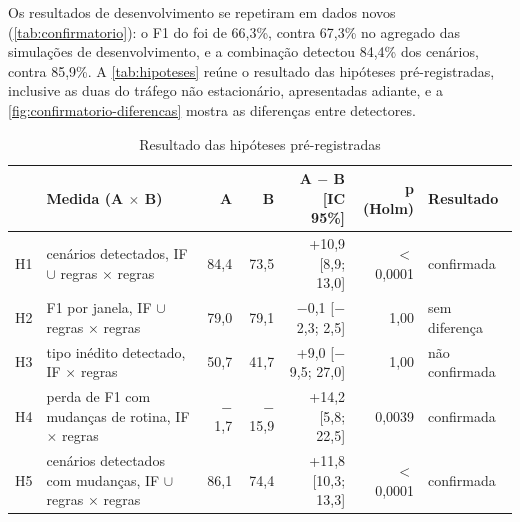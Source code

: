Os resultados de desenvolvimento se repetiram em dados novos (\autoref{tab:confirmatorio}): o F1
do \iforest{} foi de 66,3\%, contra 67,3\% no agregado das simulações de desenvolvimento, e a
combinação detectou 84,4\% dos cenários, contra 85,9\%. A \autoref{tab:hipoteses} reúne o
resultado das hipóteses pré-registradas, inclusive as duas do tráfego não estacionário,
apresentadas adiante, e a \autoref{fig:confirmatorio-diferencas} mostra as diferenças entre
detectores.

\begin{table}[htb]
    \centering
    \ABNTEXfontereduzida
    \setlength{\tabcolsep}{3pt}
    \begin{minipage}{\textwidth}
        \caption{\label{tab:hipoteses}Resultado das hipóteses pré-registradas}
        \begin{tabular*}{\textwidth}{@{\extracolsep{\fill}}lL{4.6cm}rrrrl}
            \toprule
            & \textbf{Medida (A $\times$ B)} & \textbf{A} & \textbf{B} &
            \textbf{A $-$ B [IC 95\%]} & \textbf{p (Holm)} & \textbf{Resultado} \\
            \midrule
            H1 & cenários detectados, IF $\cup$ regras $\times$ regras & 84,4 & 73,5 &
            +10,9 [8,9; 13,0] & $<$ 0,0001 & confirmada \\
            H2 & F1 por janela, IF $\cup$ regras $\times$ regras & 79,0 & 79,1 &
            $-$0,1 [$-$2,3; 2,5] & 1,00 & sem diferença \\
            H3 & tipo inédito detectado, IF $\times$ regras & 50,7 & 41,7 &
            +9,0 [$-$9,5; 27,0] & 1,00 & não confirmada \\
            \midrule
            H4 & perda de F1 com mudanças de rotina, IF $\times$ regras & $-$1,7 & $-$15,9 &
            +14,2 [5,8; 22,5] & 0,0039 & confirmada \\
            H5 & cenários detectados com mudanças, IF $\cup$ regras $\times$ regras & 86,1 & 74,4 &
            +11,8 [10,3; 13,3] & $<$ 0,0001 & confirmada \\
            \bottomrule
        \end{tabular*}
    \end{minipage}
\end{table}

